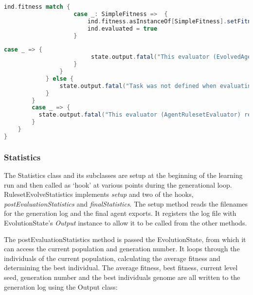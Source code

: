\begin{minipage}{0.9\linewidth}
\centering
\begin{lstlisting}[language=scala]
                ind.fitness match {
                    case _: SimpleFitness =>  {
                        ind.fitness.asInstanceOf[SimpleFitness].setFitness(state, iFitness.toDouble, false)
                        ind.evaluated = true
                    }
\end{lstlisting}
\end{minipage}

\begin{minipage}{0.9\linewidth}
\centering
\begin{lstlisting}[language=scala]
                    case _ => {
                         state.output.fatal("This evaluator (EvolvedAgentRulesetEvaluator) requires a individuals to have SimpleFitness")
                    }
                }
            } else {
                state.output.fatal("Task was not defined when evaluating individual, implying prepareToEvaluate was not run on this instance.")
            }
        }
        case _ => {
          state.output.fatal("This evaluator (AgentRulesetEvaluator) requires a ByteVectorIndividual")
        }
    }
}

\end{lstlisting}
\end{minipage}

\subsubsection{Statistics}

The Statistics class and its subclasses are setup at the beginning of the learning run and then called as `hook' at various points during the generational loop. RulesetEvolveStatistics implements \emph{setup} and two of the hooks, \emph{postEvaluationStatistics} and \emph{finalStatistics}. The setup method reads the filenames for the generation log and the final agent exports. It registers the log file with EvolutionState's \emph{Output} instance to allow it to be called from the other methods. 

The postEvaluationStatistics method is passed the EvolutionState, from which it can access the current population and generation number. It loops through the individuals of the current population, calculating the average fitness and determining the best individual. The average fitness, best fitness, current level seed, generation number and the best individuals genome are all written to the generation log using the Output class:

